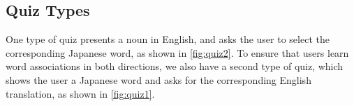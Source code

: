 \documentclass{sigchi}
\begin{document}




\pagebreak

\subsection{Quiz Types}

One type of quiz presents a noun in English, and asks the user to select the corresponding Japanese word, as shown in \autoref{fig:quiz2}. To ensure that users learn word associations in both directions, we also have a second type of quiz, which shows the user a Japanese word and asks for the corresponding English translation, as shown in \autoref{fig:quiz1}.
\end{document}

